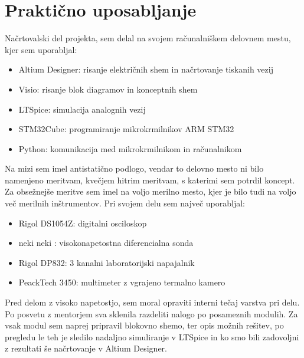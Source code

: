 \documentclass[a4paper,twoside,openright,12pt,slovene]{book}
\begin{document}
	\section{Praktično uposabljanje}
	Načrtovalski del projekta, sem delal na svojem računalniškem delovnem mestu, kjer sem uporabljal:
	\begin{itemize}
		\item Altium Designer: risanje električnih shem in načrtovanje tiskanih vezij
		\item Visio: risanje blok diagramov in konceptnih shem
		\item LTSpice: simulacija analognih vezij
		\item STM32Cube: programiranje mikrokrmilnikov ARM STM32
		\item Python: komunikacija med mikrokrmilnikom in računalnikom
	\end{itemize}
	Na mizi sem imel antistatično podlogo, vendar to delovno mesto ni bilo namenjeno meritvam, kvečjem hitrim meritvam, s katerimi sem potrdil koncept.
	Za obsežnejše meritve sem imel na voljo merilno mesto, kjer je bilo tudi na voljo več merilnih inštrumentov. Pri svojem delu sem največ uporabljal:
	\begin{itemize}
		\item Rigol DS1054Z: digitalni osciloskop
		\item neki neki : visokonapetostna diferencialna sonda
		\item Rigol DP832: 3 kanalni laboratorijski napajalnik
		\item PeackTech 3450: multimeter z vgrajeno termalno kamero
	\end{itemize}
	Pred delom z visoko napetostjo, sem moral opraviti interni tečaj varstva pri delu. Po posvetu z mentorjem sva sklenila razdeliti nalogo po posameznih modulih. Za vsak modul sem naprej pripravil blokovno shemo, ter opis možnih rešitev, po pregledu le teh je sledilo nadaljno simuliranje v LTSpice in ko smo bili zadovoljni z rezultati še načrtovanje v Altium Designer.
	
\end{document}
